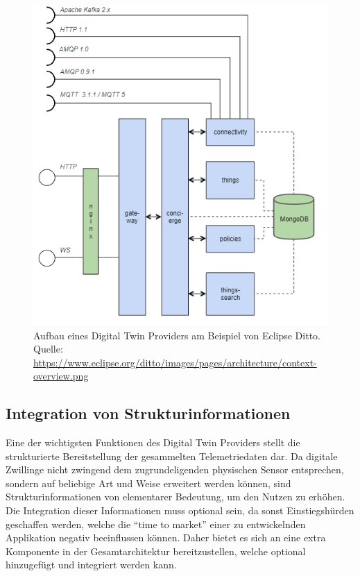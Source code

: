 \begin{figure}
    \centering
    \includegraphics[width=0.8\linewidth]{img/ditto_arch.png}
    \caption[Aufbau eines Digital Twin Providers]{Aufbau eines Digital Twin Providers am Beispiel von Eclipse Ditto.\\Quelle: \url{https://www.eclipse.org/ditto/images/pages/architecture/context-overview.png}}
    \label{fig:ditto_arch}
\end{figure}

\subsection*{Integration von Strukturinformationen}
Eine der wichtigsten Funktionen des Digital Twin Providers stellt die strukturierte Bereitstellung der gesammelten Telemetriedaten dar. Da digitale Zwillinge nicht zwingend dem zugrundeligenden physischen Sensor entsprechen, sondern auf beliebige Art und Weise erweitert werden können, sind Strukturinformationen von elementarer Bedeutung, um den Nutzen zu erhöhen. Die Integration dieser Informationen muss optional sein, da sonst Einstiegshürden geschaffen werden, welche die \enquote{time to market} einer zu entwickelnden Applikation negativ beeinflussen können. Daher bietet es sich an eine extra Komponente in der Gesamtarchitektur bereitzustellen, welche optional hinzugefügt und integriert werden kann.

